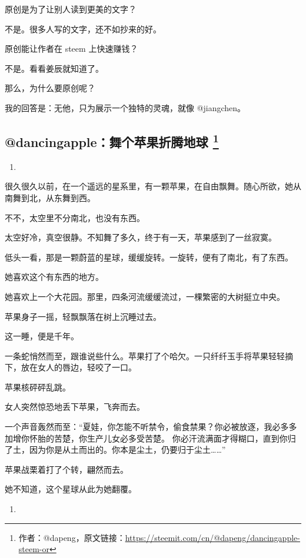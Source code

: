 \documentclass[]{ctexbook}
\begin{document}
原创是为了让别人读到更美的文字？

不是。很多人写的文字，还不如抄来的好。

原创能让作者在 steem 上快速赚钱？

不是。看看姜辰就知道了。

那么，为什么要原创呢？

我的回答是：无他，只为展示一个独特的灵魂，就像 @jiangchen。

\hypertarget{dancingapple}{%
\subsection[@dancingapple：舞个苹果折腾地球 ]{\texorpdfstring{@dancingapple：舞个苹果折腾地球 \footnote{作者：@dapeng，原文链接：\url{https://steemit.com/cn/@dapeng/dancingapple-steem-or}}}{@dancingapple：舞个苹果折腾地球 }}\label{dancingapple}}

\begin{enumerate}
\def\labelenumi{(\arabic{enumi})}
\item
\end{enumerate}

很久很久以前，在一个遥远的星系里，有一颗苹果，在自由飘舞。随心所欲，她从南舞到北，从东舞到西。

不不，太空里不分南北，也没有东西。

太空好冷，真空很静。不知舞了多久，终于有一天，苹果感到了一丝寂寞。

低头一看，那是一颗蔚蓝的星球，缓缓旋转。一旋转，便有了南北，有了东西。

她喜欢这个有东西的地方。

她喜欢上一个大花园。那里，四条河流缓缓流过，一棵繁密的大树挺立中央。

苹果身子一摇，轻飘飘落在树上沉睡过去。

这一睡，便是千年。

一条蛇悄然而至，跟谁说些什么。苹果打了个哈欠。一只纤纤玉手将苹果轻轻摘下，放在女人的唇边，轻咬了一口。

苹果核砰砰乱跳。

女人突然惊恐地丢下苹果，飞奔而去。

一个声音轰然而至：``夏娃，你怎能不听禁令，偷食禁果？你必被放逐，我必多多加增你怀胎的苦楚，你生产儿女必多受苦楚。 你必汗流满面才得糊口，直到你归了土，因为你是从土而出的。你本是尘土，仍要归于尘土\ldots{}\ldots{}''

苹果战栗着打了个转，翩然而去。

她不知道，这个星球从此为她翻覆。

\begin{enumerate}
\def\labelenumi{(\arabic{enumi})}
\setcounter{enumi}{1}
\item
\end{enumerate}
\end{document}
